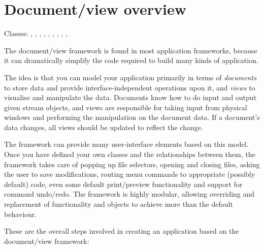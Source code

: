 \section{Document/view overview}\label{docviewoverview}

Classes: , , ,\rtfsp
{}, , ,
\rtfsp{}, ,
\rtfsp{}, 

The document/view framework is found in most application frameworks, because it
can dramatically simplify the code required to build many kinds of application.

The idea is that you can model your application primarily in terms of {\it documents} to store data
and provide interface-independent operations upon it, and {\it views} to visualise and manipulate
the data. Documents know how to do input and output given stream objects, and views are responsible
for taking input from physical windows and performing the manipulation on the document data.
If a document's data changes, all views should be updated to reflect the change.

The framework can provide many user-interface elements based on this model. Once you have defined
your own classes and the relationships between them, the framework takes care
of popping up file selectors, opening and closing files, asking the user to save
modifications, routing menu commands to appropriate (possibly default) code, even
some default print/preview functionality and support for command undo/redo.
The framework is highly modular, allowing overriding and replacement of functionality
and objects to achieve more than the default behaviour.

These are the overall steps involved in creating an application based on the document/view framework:

